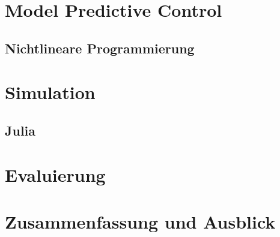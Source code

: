 \documentclass{like}
\begin{document}
\chapter{Model Predictive Control}
\section{Nichtlineare Programmierung}

\chapter{Simulation}
\section{Julia}

\chapter{Evaluierung}

\chapter[Zusammenfassung]{Zusammenfassung und Ausblick}


\appendix





%



%


\end{document}
